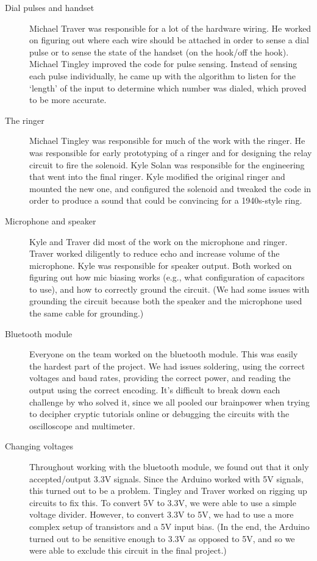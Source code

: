 \documentclass{es50report}
\begin{document}
        \begin{description}
            \item[Dial pulses and handset]
                Michael Traver was responsible for a lot of the hardware wiring. He worked on figuring out where each wire should be attached in order to sense a dial pulse or to sense the state of the handset (on the hook/off the hook). Michael Tingley improved the code for pulse sensing. Instead of sensing each pulse individually, he came up with the algorithm to listen for the `length' of the input to determine which number was dialed, which proved to be more accurate.
            \item[The ringer]
                Michael Tingley was responsible for much of the work with the ringer. He was responsible for early prototyping of a ringer and for designing the relay circuit to fire the solenoid. Kyle Solan was responsible for the engineering that went into the final ringer. Kyle modified the original ringer and mounted the new one, and configured the solenoid and tweaked the code in order to produce a sound that could be convincing for a 1940s-style ring.
            \item[Microphone and speaker]
                Kyle and Traver did most of the work on the microphone and ringer. Traver worked diligently to reduce echo and increase volume of the microphone. Kyle was responsible for speaker output. Both worked on figuring out how mic biasing works (e.g., what configuration of capacitors to use), and how to correctly ground the circuit. (We had some issues with grounding the circuit because both the speaker and the microphone used the same cable for grounding.)
            \item[Bluetooth module]
                Everyone on the team worked on the bluetooth module. This was easily the hardest part of the project. We had issues soldering, using the correct voltages and baud rates, providing the correct power, and reading the output using the correct encoding. It's difficult to break down each challenge by who solved it, since we all pooled our brainpower when trying to decipher cryptic tutorials online or debugging the circuits with the oscilloscope and multimeter.
            \item[Changing voltages]
                Throughout working with the bluetooth module, we found out that it only accepted/output 3.3V signals. Since the Arduino worked with 5V signals, this turned out to be a problem. Tingley and Traver worked on rigging up circuits to fix this. To convert 5V to 3.3V, we were able to use a simple voltage divider. However, to convert 3.3V to 5V, we had to use a more complex setup of transistors and a 5V input bias. (In the end, the Arduino turned out to be sensitive enough to 3.3V as opposed to 5V, and so we were able to exclude this circuit in the final project.)

\end{description}
\end{document}

